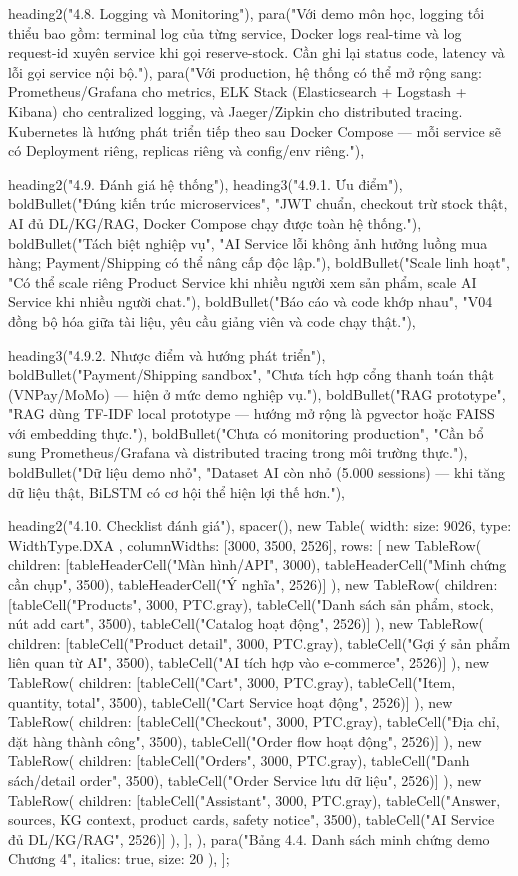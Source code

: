{{{  heading2("4.8. Logging và Monitoring"),
  para("Với demo môn học, logging tối thiểu bao gồm: terminal log của từng service, Docker logs real-time và log request-id xuyên service khi gọi reserve-stock. Cần ghi lại status code, latency và lỗi gọi service nội bộ."),
  para("Với production, hệ thống có thể mở rộng sang: Prometheus/Grafana cho metrics, ELK Stack (Elasticsearch + Logstash + Kibana) cho centralized logging, và Jaeger/Zipkin cho distributed tracing. Kubernetes là hướng phát triển tiếp theo sau Docker Compose — mỗi service sẽ có Deployment riêng, replicas riêng và config/env riêng."),

  heading2("4.9. Đánh giá hệ thống"),
  heading3("4.9.1. Ưu điểm"),
  boldBullet("Đúng kiến trúc microservices", "JWT chuẩn, checkout trừ stock thật, AI đủ DL/KG/RAG, Docker Compose chạy được toàn hệ thống."),
  boldBullet("Tách biệt nghiệp vụ", "AI Service lỗi không ảnh hưởng luồng mua hàng; Payment/Shipping có thể nâng cấp độc lập."),
  boldBullet("Scale linh hoạt", "Có thể scale riêng Product Service khi nhiều người xem sản phẩm, scale AI Service khi nhiều người chat."),
  boldBullet("Báo cáo và code khớp nhau", "V04 đồng bộ hóa giữa tài liệu, yêu cầu giảng viên và code chạy thật."),

  heading3("4.9.2. Nhược điểm và hướng phát triển"),
  boldBullet("Payment/Shipping sandbox", "Chưa tích hợp cổng thanh toán thật (VNPay/MoMo) — hiện ở mức demo nghiệp vụ."),
  boldBullet("RAG prototype", "RAG dùng TF-IDF local prototype — hướng mở rộng là pgvector hoặc FAISS với embedding thực."),
  boldBullet("Chưa có monitoring production", "Cần bổ sung Prometheus/Grafana và distributed tracing trong môi trường thực."),
  boldBullet("Dữ liệu demo nhỏ", "Dataset AI còn nhỏ (5.000 sessions) — khi tăng dữ liệu thật, BiLSTM có cơ hội thể hiện lợi thế hơn."),

  heading2("4.10. Checklist đánh giá"),
  spacer(),
  new Table({
    width: { size: 9026, type: WidthType.DXA },
    columnWidths: [3000, 3500, 2526],
    rows: [
      new TableRow({ children: [tableHeaderCell("Màn hình/API", 3000), tableHeaderCell("Minh chứng cần chụp", 3500), tableHeaderCell("Ý nghĩa", 2526)] }),
      new TableRow({ children: [tableCell("Products", 3000, PTC.gray), tableCell("Danh sách sản phẩm, stock, nút add cart", 3500), tableCell("Catalog hoạt động", 2526)] }),
      new TableRow({ children: [tableCell("Product detail", 3000, PTC.gray), tableCell("Gợi ý sản phẩm liên quan từ AI", 3500), tableCell("AI tích hợp vào e-commerce", 2526)] }),
      new TableRow({ children: [tableCell("Cart", 3000, PTC.gray), tableCell("Item, quantity, total", 3500), tableCell("Cart Service hoạt động", 2526)] }),
      new TableRow({ children: [tableCell("Checkout", 3000, PTC.gray), tableCell("Địa chỉ, đặt hàng thành công", 3500), tableCell("Order flow hoạt động", 2526)] }),
      new TableRow({ children: [tableCell("Orders", 3000, PTC.gray), tableCell("Danh sách/detail order", 3500), tableCell("Order Service lưu dữ liệu", 2526)] }),
      new TableRow({ children: [tableCell("Assistant", 3000, PTC.gray), tableCell("Answer, sources, KG context, product cards, safety notice", 3500), tableCell("AI Service đủ DL/KG/RAG", 2526)] }),
    ],
  }),
  para("Bảng 4.4. Danh sách minh chứng demo Chương 4", { italics: true, size: 20 }),
];

}}}
